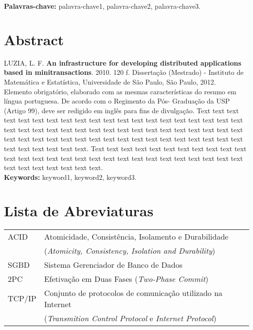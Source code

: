 \documentclass[11pt,twoside,a4paper]{book}
\begin{document}
\noindent \textbf{Palavras-chave:} palavra-chave1, palavra-chave2, palavra-chave3.

\chapter*{Abstract}
\noindent LUZIA, L. F. \textbf{An infrastructure for developing distributed applications based in minitransactions}. 
2010. 120 f.
Dissertação (Mestrado) - Instituto de Matemática e Estatística,
Universidade de São Paulo, São Paulo, 2012.
\\


Elemento obrigatório, elaborado com as mesmas características do resumo em
língua portuguesa. De acordo com o Regimento da Pós- Graduação da USP (Artigo
99), deve ser redigido em inglês para fins de divulgação. 
Text text text text text text text text text text text text text text text text
text text text text text text text text text text text text text text text text
text text text text text text text text text text text text text text text text
text text text text text text text text text text text text.
Text text text text text text text text text text text text text text text text
text text text text text text text text text text text text text text text text
text text text.
\\

\noindent \textbf{Keywords:} keyword1, keyword2, keyword3.

\tableofcontents

\chapter{Lista de Abreviaturas}
\begin{tabular}{ll}
	ACID		& Atomicidade, Consistência, Isolamento e Durabilidade \\
			& (\emph{Atomicity, Consistency, Isolation and Durability})\\
        SGBD	& Sistema Gerenciador de Banco de Dados\\
	2PC		& Efetivação em Duas Fases (\emph{Two-Phase Commit})\\
	TCP/IP	& Conjunto de protocolos de comunicação utilizado na Internet\\
			& (\emph{Transmition Control Protocol} e \emph{Internet Protocol})\\
\end{tabular}

\listoffigures
\listoftables
\end{document}
